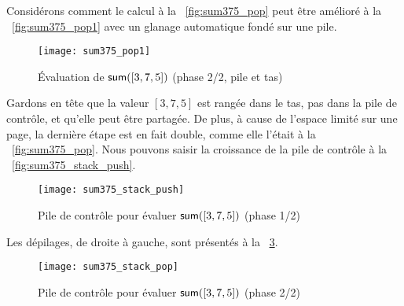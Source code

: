 Considérons comment le calcul à la \fig~\vref{fig:sum375_pop} peut
être amélioré à la \fig~\vref{fig:sum375_pop1} avec un glanage
automatique fondé sur une pile.
\begin{figure}[b]
\centering
\texttt{[image: sum375\_pop1]}
\caption{Évaluation de \(\textsf{sum}([3,7,5])\) (phase 2/2, pile et tas)}
\label{fig:sum375_pop1}
\end{figure}
Gardons en tête que la valeur \([3,7,5]\) est rangée dans le tas, pas
dans la pile de contrôle, et qu'elle peut être partagée. De plus, à
cause de l'espace limité sur une page, la dernière étape est en fait
double, comme elle l'était à la \fig~\vref{fig:sum375_pop}. Nous
pouvons saisir la croissance de la pile de contrôle à la
\fig~\vref{fig:sum375_stack_push}.
\begin{figure}
\centering
\texttt{[image: sum375\_stack\_push]}
\caption{Pile de contrôle pour évaluer \(\textsf{sum}([3,7,5])\) (phase 1/2)}
\label{fig:sum375_stack_push}
\end{figure}
Les dépilages, de droite à gauche, sont présentés à la
\fig~\ref{fig:sum375_stack_pop}.
\begin{figure}
\centering
\texttt{[image: sum375\_stack\_pop]}
\caption{Pile de contrôle pour évaluer \(\textsf{sum}([3,7,5])\) (phase 2/2)}
\label{fig:sum375_stack_pop}
\end{figure}

